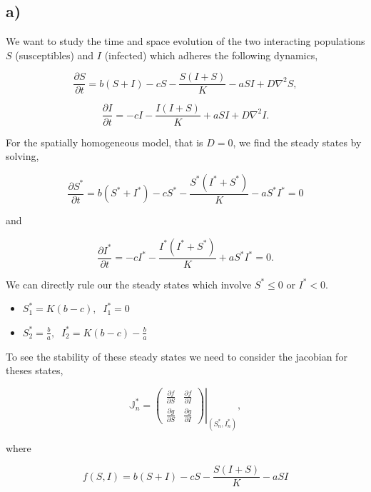 \subsection*{a)}

We want to study the time and space evolution of the two interacting populations $S$ (susceptibles) and $I$ (infected) which adheres the following dynamics,

\begin{equation}
\label{eq:partSt}
\frac{\partial S}{\partial t} = b(S+I)-cS -\frac{S(I+S)}{K}-aSI + D\nabla^2S,
\end{equation}

\begin{equation}
\label{eq:partIt}
\frac{\partial I}{\partial t}= -cI -\frac{I(I+S)}{K}+aSI +D\nabla^2I.
\end{equation}

For the spatially homogeneous model, that is $D=0$, we find the steady states by solving,

$$
\frac{\partial S^*}{\partial t}=b(S^*+I^*)-cS^*-\frac{S^*(I^*+S^*)}{K}-aS^*I^* =0
$$

and

$$
\frac{\partial I^*}{\partial t}=-cI^*-\frac{I^*(I^*+S^*)}{K}+aS^*I^*=0.
$$

We can directly rule our the steady states which involve $S^*\leq0$ or $I^*<0$.

\begin{itemize}
\item $S^*_1=K(b-c), \;\; I^*_1=0$
\item $S^*_2=\frac{b}{a}, \;\; I^*_2=K(b-c)-\frac{b}{a}$ 
\end{itemize}



To see the stability of these steady states we need to consider the jacobian for theses states,

\begin{equation}
\mathbb{J}^*_n=\left.\left(
\begin{array}{cc}
\frac{\partial f}{\partial S} & \frac{\partial f}{\partial I} \\
\frac{\partial g}{\partial S} & \frac{\partial g}{\partial I}
\end{array}\right)\right|_{(S^*_n,I^*_n)},
\end{equation}

where 

\begin{equation}
f(S,I)=b(S+I)-cS-\frac{S(I+S)}{K}-aSI
\end{equation}

